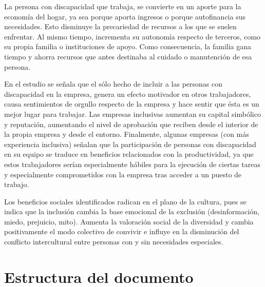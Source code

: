 La persona con discapacidad que trabaja, se convierte en un aporte para la economía del hogar, ya sea porque aporta ingresos o porque autofinancia sus necesidades. Esto disminuye la precariedad de recursos a los que se suelen enfrentar. Al mismo tiempo, incrementa su autonomía respecto de terceros, como su propia familia o instituciones de apoyo. Como consecuencia, la familia gana tiempo y ahorra recursos que antes destinaba al cuidado o manutención de esa persona. 

En el estudio se señala que el sólo hecho de incluir a las personas con discapacidad en la empresa, genera un efecto motivador en otros trabajadores, causa sentimientos de orgullo respecto de la empresa y hace sentir que ésta es un mejor lugar para trabajar. Las empresas inclusivas aumentan su capital simbólico y reputación, aumentando el nivel de aprobación que reciben desde el interior de la propia empresa y desde el entorno. Finalmente, algunas empresas (con más experiencia inclusiva) señalan que la participación de personas con discapacidad en su equipo se traduce en beneficios relacionados con la productividad, ya que estos trabajadores serían especialmente hábiles para la ejecución de ciertas tareas y especialmente comprometidos con la empresa tras acceder a un puesto de trabajo. 

Los beneficios sociales identificados radican en el plano de la cultura, pues se indica que la inclusión cambia la base emocional de la exclusión (desinformación, miedo, prejuicio, mito). Aumenta la valoración social de la diversidad  y cambia positivamente el modo colectivo de convivir e influye en la disminución del conflicto intercultural entre personas con y sin necesidades especiales.
 
\section{Estructura del documento}

